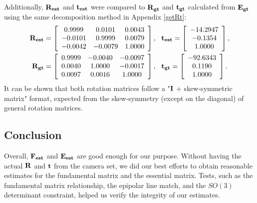 \documentclass[12pt]{article} %
\begin{document}
\noindent Additionally, ${\bf R_{est}}$ and ${\bf t_{est}}$ were compared to ${\bf R_{gt}}$ and ${\bf t_{gt}}$ calculated from ${\bf E_{gt}}$ using the same decomposition method in Appendix \ref{getRt}:
\begin{equation*}
	\begin{aligned}
		{\bf R_{est}} &= 
		\left[\begin{array}{ccc}
			0.9999 & 0.0101 & 0.0043\\
			-0.0101 & 0.9999 & 0.0079\\
			-0.0042 & -0.0079 & 1.0000\\
		\end{array}\right],\ \ 
		{\bf t_{est}} = 
		\left[\begin{array}{c}
			-14.2947\\ -0.1354\\ 1.0000\\
		\end{array}\right],\\
		{\bf R_{gt}} &= 
		\left[\begin{array}{ccc}
			0.9999 & -0.0040 & -0.0097\\
			0.0040 & 1.0000 & -0.0017\\
			0.0097 & 0.0016 & 1.0000\\
		\end{array}\right],\ \ 
		{\bf t_{gt}} = 
		\left[\begin{array}{c}
			-92.6343\\ 0.1190\\ 1.0000\\
		\end{array}\right].
	\end{aligned}
\end{equation*}
It can be shown that both rotation matrices follow a "${\bf I}$ + skew-symmetric matrix" format, expected from the skew-symmetry (except on the diagonal) of general rotation matrices.\\

\subsection{Conclusion}
Overall, ${\bf F_{est}}$ and ${\bf E_{est}}$ are good enough for our purpose. Without having the actual ${\bf R}$ and ${\bf t}$ from the camera set, we did our best efforts to obtain reasonable estimates for the fundamental matrix and the essential matrix. Tests, such as the fundamental matrix relationship, the epipolar line match, and the $SO(3)$ determinant constraint, helped us verify the integrity of our estimates.
\end{document}
